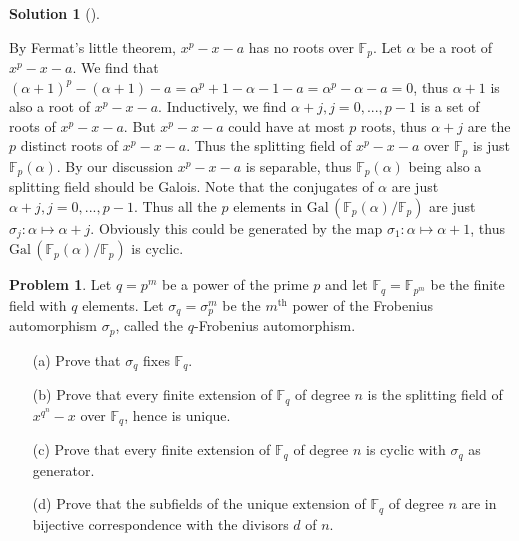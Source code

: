 \documentclass{article}
\theoremstyle{definition}
\newtheorem{prob}{Problem}
\newtheorem*{sol}{Solution}
\newenvironment{sols}[1][]{%
  \begin{sol}[#1]$ $\par\nobreak\ignorespaces
}{%
  \end{sol}
}
\newcommand{\FF}{\mathbb F}
\newcommand{\Gal}{\text{Gal}\,}
\begin{document}
\begin{sols}
	By Fermat's little theorem, $x^p - x - a$ has no roots over $\FF_p$.
	Let $\alpha$ be a root of $x^p - x - a$.
	We find that $(\alpha + 1)^p - (\alpha + 1) - a = \alpha^p + 1 - \alpha - 1 - a = \alpha^p - \alpha - a = 0$, thus $\alpha + 1$ is also a root of $x^p - x - a$.
	Inductively, we find $\alpha + j, j = 0, ..., p - 1$ is a set of roots of $x^p - x - a$.
	But $x^p - x - a$ could have at most $p$ roots, thus $\alpha + j$ are the $p$ distinct roots of $x^p - x - a$.
	Thus the splitting field of $x^p - x - a$ over $\FF_p$ is just $\FF_p(\alpha)$.
	By our discussion $x^p - x - a$ is separable, thus $\FF_p(\alpha)$ being also a splitting field should be Galois.
	Note that the conjugates of $\alpha$ are just $\alpha + j, j = 0, ..., p - 1$.
	Thus all the $p$ elements in $\Gal(\FF_p(\alpha)/\FF_p)$ are just $\sigma_j: \alpha \mapsto \alpha + j$.
	Obviously this could be generated by the map $\sigma_1: \alpha \mapsto \alpha + 1$, thus $\Gal(\FF_p(\alpha)/\FF_p)$ is cyclic.
\end{sols}

\begin{prob}
	Let $q = p^m$ be a power of the prime $p$ and let $\FF_q = \FF_{p^m}$ be the finite field with $q$ elements.
	Let $\sigma_q = \sigma_p^m$ be the $m^{\text{th}}$ power of the Frobenius automorphism $\sigma_p$, called the $q$-Frobenius automorphism.

	\begin{enumerate}
		\item[(a)] Prove that $\sigma_q$ fixes $\FF_q$.

		\item[(b)] Prove that every finite extension of $\FF_q$ of degree $n$ is the splitting field of $x^{q^n} - x$ over $\FF_q$, hence is unique.

		\item[(c)] Prove that every finite extension of $\FF_q$ of degree $n$ is cyclic with $\sigma_q$ as generator.

		\item[(d)] Prove that the subfields of the unique extension of $\FF_q$ of degree $n$ are in bijective correspondence with the divisors $d$ of $n$.
	\end{enumerate}
\end{prob}
\end{document}
